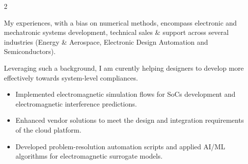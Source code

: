\documentclass[9pt,a4paper,ragged2e,withhyper]{altacv} %
\begin{document}
\makecvheader


\begin{paracol}{2}

My experiences, with a bias on numerical methods, encompass electronic and mechatronic systems development, technical sales \& support across several industries (Energy \& Aerospace, Electronic Design Automation and Semiconductors).

\medskip

Leveraging such a background, I am curently helping designers to develop more effectively towards system-level compliances.



\begin{itemize}

\item Implemented electromagnetic simulation flows for SoCs development and electromagnetic interference predictions.
\item Enhanced vendor solutions to meet the design and integration requirements of the cloud platform.
\item Developed problem-resolution automation scripts and applied AI/ML algorithms for electromagnetic surrogate models.
\end{itemize}
\divider


\end{paracol}
\end{document}
